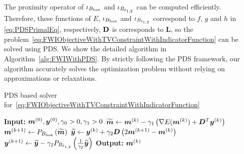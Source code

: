 The proximity operator of $\iota_{B_{\mathrm{box}}}$ and $\iota_{B_{\ell_{1,2}}}$ can be computed efficiently.
Therefore, these functions of $E$, $\iota_{B_{\mathrm{box}}}$ and $\iota_{B_{\ell_{1,2}}}$ correspond to $f$, $g$ and $h$ in \eqref{eq:PDSPrimalEq}, respectively, $\mathbf{D}$ is corresponds to $\bm{L}$, so the problem~\eqref{eq:FWIObjectiveWithTVConstraintWithIndicatorFunction} can be solved using PDS.
We show the detailed algorithm in Algorithm~\ref{alg:FWIWithPDS}.
By strictly following the PDS framework, our algorithm accurately solves the optimization problem without relying on approximations or relaxations.
\begin{algorithm}[t]
    \caption{PDS based solver for~\eqref{eq:FWIObjectiveWithTVConstraintWithIndicatorFunction}}\label{alg:FWIWithPDS}
    \begin{algorithmic}[1]
        \Statex \textbf{Input:} $ \bm{m}^{(0)}, \bm{y}^{(0)}, \gamma_0 > 0, \gamma_1 > 0 $
            \State $\widetilde{\bm{m}} \leftarrow \bm{m}^{(k)} - \gamma_1 \left( \nabla E(\bm{m}^{(k)}) + \bm{D}^T \bm{y}^{(k)} \right) $
            \State $\bm{m}^{(k+1)}     \leftarrow P_{B_{\mathrm{box}}} \left( \widetilde{\bm{m}} \right) $
            \State $\widetilde{\bm{y}}     \leftarrow \bm{y}^{(k)} + \gamma_2 \bm{D} \left( 2\bm{m}^{(k+1)} - \bm{m}^{(k)} \right) $
            \State $\bm{y}^{(k+1)}         \leftarrow \widetilde{\bm{y}} - \gamma_2 P_{B_{\ell_{1,2}}}\left(\frac 1 {\gamma_2} {\widetilde{\bm y}}\right) $
        \EndWhile
        \Statex \textbf{Output:} $\bm{m}^{(k)}$
    \end{algorithmic}
\end{algorithm}


